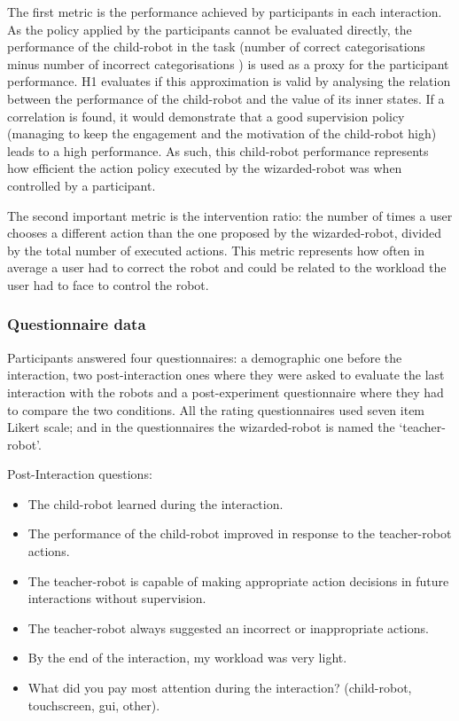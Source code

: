 The first metric is the performance achieved by participants in each interaction. As the policy applied by the participants cannot be evaluated directly, the performance of the child-robot in the task (number of correct categorisations minus number of incorrect categorisations ) is used as a proxy for the participant performance. H1 evaluates if this approximation is valid by analysing the relation between the performance of the child-robot and the value of its inner states. If a correlation is found, it would demonstrate that a good supervision policy (managing to keep the engagement and the motivation of the child-robot high) leads to a high performance. As such, this child-robot performance represents how efficient the action policy executed by the wizarded-robot was when controlled by a participant.

The second important metric is the intervention ratio: the number of times a user chooses a different action than the one proposed by the wizarded-robot, divided by the total number of executed actions. This metric represents how often in average a user had to correct the robot and could be related to the workload the user had to face to control the robot.

\subsubsection{Questionnaire data}
 
Participants answered four questionnaires: a demographic one before the interaction, two post-interaction ones where they were asked to evaluate the last interaction with the robots and a post-experiment questionnaire where they had to compare the two conditions. All the rating questionnaires used seven item Likert scale; and in the questionnaires the wizarded-robot is named the `teacher-robot'.

Post-Interaction questions:
\begin{itemize}
	\item The child-robot learned during the interaction.
	\item The performance of the child-robot improved in response to the teacher-robot actions.
	\item The teacher-robot is capable of making appropriate action decisions in future interactions without supervision.
	\item The teacher-robot always suggested an incorrect or inappropriate actions.
	\item By the end of the interaction, my workload was very light.
	\item What did you pay most attention during the interaction? (child-robot, touchscreen, \gls{gui}, other).
\end{itemize}

